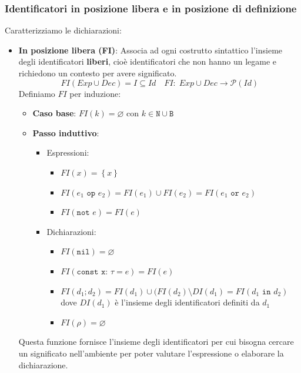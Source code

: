 \documentclass[a4paper]{article}
\begin{document}
\subsubsection{Identificatori in posizione libera e in posizione di definizione}
Caratterizziamo le dichiarazioni:
\begin{itemize}
  \item \textbf{In posizione libera (FI)}: Associa ad ogni costrutto sintattico
    l'insieme degli identificatori \textbf{liberi}, cioè identificatori che non hanno
    un legame e richiedono un contesto per avere significato.
    \[
      FI(Exp \cup Dec) = I \subseteq Id \quad FI:\; Exp \cup Dec \to \mathcal{P}(Id)
    \] 
    Definiamo \( FI \) per induzione:
    \begin{itemize}
      \item \textbf{Caso base}: \( FI(k) = \varnothing \) con \( k \in \texttt{N} \cup \texttt{B} \)
      \item \textbf{Passo induttivo}:
        \begin{itemize}
          \item Espressioni:
            \begin{itemize}
              \item \( FI(x) = \left\{ x \right\} \) 
              \item \( FI(e_1 \texttt{ op } e_2) = FI(e_1) \cup FI(e_2) = FI(e_1 \texttt{ or } e_2) \) 
              \item \( FI(\texttt{not } e) = FI(e)\) 
            \end{itemize}

          \item Dichiarazioni:
            \begin{itemize}
              \item \( FI(\texttt{nil}) = \varnothing \) 
              \item \( FI(\texttt{const x: } \tau = e) = FI(e) \) 
              \item \( FI(d_1; d_2) = FI(d_1) \cup (FI(d_2) \setminus DI(d_1) = FI(d_1 \texttt{ in } d_2) \) dove
                \( DI(d_1) \) è l'insieme degli identificatori definiti da \( d_1 \) 
              \item \( FI(\rho) = \varnothing \) 
            \end{itemize}
        \end{itemize}
    \end{itemize}
    Questa funzione fornisce l'insieme degli identificatori per cui bisogna cercare
    un significato nell'ambiente per poter valutare l'espressione o elaborare la
    dichiarazione.


\end{itemize}
\end{document}
